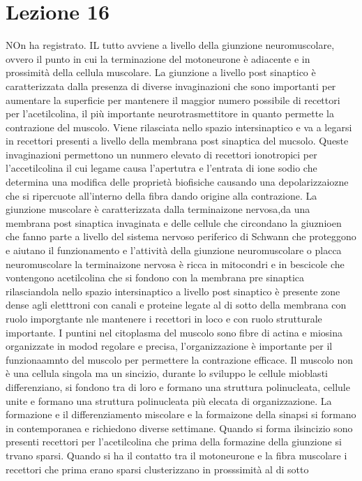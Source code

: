 \section{Lezione 16}
NOn ha registrato. IL tutto avviene a livello della giunzione neuromuscolare, ovvero il punto in cui la terminazione del motoneurone \`e adiacente e in prossimit\`a della cellula 
muscolare. La giunzione a livello post sinaptico \`e caratterizzata dalla presenza di diverse invaginazioni che sono importanti per aumentare la superficie per mantenere il maggior numero
possibile di recettori per l'acetilcolina, il pi\`u importante neurotrasmettitore in quanto permette la contrazione del muscolo. Viene rilasciata nello spazio intersinaptico e va a 
legarsi in recettori presenti a livello della membrana post sinaptica del mucsolo. Queste invaginazioni permettono un nunmero elevato di recettori ionotropici per l'accetilcolina il 
cui legame causa l'apertutra e l'entrata di ione sodio che determina una modifica delle propriet\`a biofisiche causando una depolarizzaiozne che si ripercuote all'interno della 
fibra dando origine alla contrazione. La giunzione muscolare \`e caratterizzata dalla terminaizone nervosa,da una membrana post sinaptica invaginata e delle cellule che circondano la
giuznioen che fanno parte a livello del sistema nervoso periferico di Schwann che proteggono e aiutano il funzionamento e l'attivit\`a della giunzione neuromuscolare o placca 
neuromuscolare la terminaizone nervosa \`e ricca in mitocondri e in bescicole che vontengono acetilcolina che si fondono con la membrana pre sinaptica rilasciandola nello spazio 
intersinaptico a livello post sinaptico \`e presente zone dense agli eletttroni con canali e proteine legate al di sotto della membrana con ruolo imporgtante nle mantenere i recettori in
loco e con ruolo strutturale importante. I puntini nel citoplasma del muscolo sono fibre di actina e miosina organizzate in modod regolare e precisa, l'organizzazione \`e importante 
per il funzionaamnto del muscolo per permettere la contrazione efficace. Il muscolo non \`e una cellula singola ma un sincizio, durante lo sviluppo le cellule mioblasti differenziano, si 
fondono tra di loro e formano una struttura polinucleata, cellule unite e formano una struttura polinucleata pi\`u elecata di organizzazione. La formazione e il differenziamento miscolare
e la formaizone della sinapsi si formano in contemporanea e richiedono diverse settimane. Quando si forma ilsincizio sono presenti recettori per l'acetilcolina che prima della 
formazine della giunzione si trvano sparsi. Quando si ha il contatto tra il motoneurone e la fibra muscolare i recettori che prima erano sparsi clusterizzano in prosssimit\`a al di sotto
